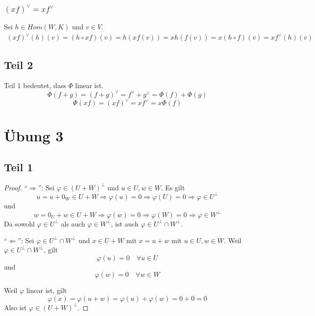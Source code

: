 \documentclass[a4paper,10pt]{article}
\begin{document}
\subsubsection*{$(xf)^\vee = xf^\vee$}

Sei $h \in Hom(W, K)$ und $v \in V$.
\begin{align}
 (xf)^\vee(h)(v) = (h \circ xf)(v) = h(xf(v)) = xh(f(v)) = x(h \circ f)(v) = xf^\vee(h)(v)
\end{align}

\subsection*{Teil 2}

Teil 1 bedeutet, dass $\Phi$ linear ist.
\begin{equation}
 \Phi(f + g) = (f + g)^\vee = f^\vee + g^\vee = \Phi(f) + \Phi(g)
\end{equation}
\begin{equation}
 \Phi(xf) = (xf)^\vee = xf^\vee = x\Phi(f)
\end{equation}

\section*{Übung 3}

\subsection*{Teil 1}

\begin{proof}
 ``$\Rightarrow$'': Sei $\varphi \in (U + W)^\perp$ und $u \in U, w \in W$.
 Es gilt
 \begin{equation}
  u = u + 0_W \in U + W \Rightarrow \varphi(u) = 0 \Rightarrow \varphi(U) = 0 \Rightarrow \varphi \in U^\perp
 \end{equation}
 und 
 \begin{equation}
  w = 0_U + w \in U + W \Rightarrow \varphi(w) = 0 \Rightarrow \varphi(W) = 0 \Rightarrow \varphi \in W^\perp
 \end{equation}
 Da sowohl $\varphi \in U^\perp$ als auch $\varphi \in W^\perp$, ist auch $\varphi \in U^\perp \cap W^\perp$.

 ``$\Leftarrow$'': Sei $\varphi \in U^\perp \cap W^\perp$ und $x \in U + W$ mit $x = u + w$ mit $u \in U, w \in W$.
 Weil $\varphi \in U^\perp \cap W^\perp$, gilt
 \begin{equation}
  \varphi(u) = 0 \quad \forall u \in U
 \end{equation}
 und
 \begin{equation}
  \varphi(w) = 0 \quad \forall w \in W
 \end{equation}

 Weil $\varphi$ linear ist, gilt
 \begin{equation}
  \varphi(x) = \varphi(u + w) = \varphi(u) + \varphi(w) = 0 + 0 = 0
 \end{equation}
 Also ist $\varphi \in (U + W)^\perp$.
\end{proof}
\end{document}
